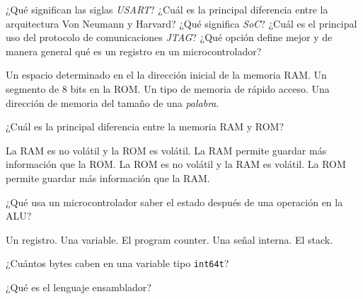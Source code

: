 \documentclass[10pt,letterpaper]{exam}
\begin{document}
\begin{questions}
    \vspace{5mm}
    \question[10] ¿Qué significan las siglas \textit{USART}?
    \question[10] ¿Cuál es la principal diferencia entre la arquitectura Von Neumann y Harvard?
    \question[10] ¿Qué significa \textit{SoC}?
    \question[10] ¿Cuál es el principal uso del protocolo de comunicaciones \textit{JTAG}?
    \question[10] ¿Qué opción define mejor y de manera general qué es un registro en un microcontrolador? 
    \begin{choices}
        \choice Un espacio determinado en el la dirección inicial de la memoria RAM.
        \choice Un segmento de 8 bits en la ROM.
        \choice Un tipo de memoria de rápido acceso.
        \choice Una dirección de memoria del tamaño de una \textit{palabra}.
    \end{choices}
    \question[10] ¿Cuál es la principal diferencia entre la memoria RAM y ROM? 
    \begin{choices}
        \choice La RAM es no volátil y la ROM es volátil.
        \choice La RAM permite guardar más información que la ROM.
        \choice La ROM es no volátil y la RAM es volátil.
        \choice La ROM permite guardar más información que la RAM.
    \end{choices}
    \clearpage
    \question[10] ¿Qué usa un microcontrolador saber el estado después de una operación en la ALU?
    \begin{choices}
        \choice Un registro.
        \choice Una variable.
        \choice El program counter.
        \choice Una señal interna. 
        \choice El stack.
    \end{choices}
    \question[10] ¿Cuántos bytes caben en una variable tipo \texttt{int64\textunderscore t}? 
    \begin{choices}
    \end{choices}
    \question[10] ¿Qué es el lenguaje ensamblador?

\end{questions}
\end{document}
